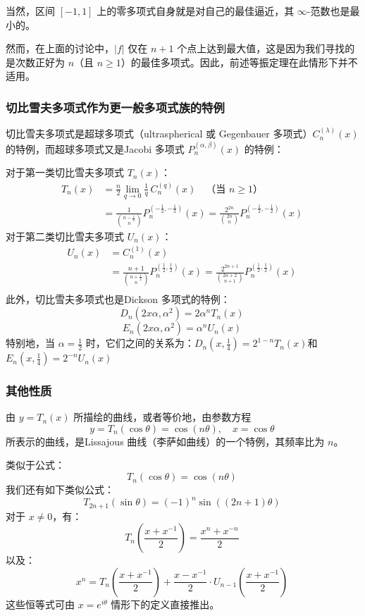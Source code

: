 当然，区间 $[-1,1]$ 上的零多项式自身就是对自己的最佳逼近，其 $\infty$-范数也是最小的。

然而，在上面的讨论中，$|f|$ 仅在 $n + 1$ 个点上达到最大值，这是因为我们寻找的是次数正好为 $n$（且 $n \geq 1$）的最佳多项式。因此，前述等振定理在此情形下并不适用。
\subsubsection{切比雪夫多项式作为更一般多项式族的特例}
切比雪夫多项式是超球多项式（ultraspherical 或 Gegenbauer 多项式）$C_n^{(\lambda)}(x)$ 的特例，而超球多项式又是Jacobi 多项式 $P_n^{(\alpha, \beta)}(x)$ 的特例：

对于第一类切比雪夫多项式 $T_n(x)$：
$$
\begin{aligned}
T_n(x) &= \frac{n}{2} \lim_{q \to 0} \frac{1}{q} \, C_n^{(q)}(x) \quad \text{（当 } n \geq 1\text{）}\\
&= \frac{1}{\binom{n - \frac{1}{2}}{n}} P_n^{(-\frac{1}{2}, -\frac{1}{2})}(x) = \frac{2^{2n}}{\binom{2n}{n}} P_n^{(-\frac{1}{2}, -\frac{1}{2})}(x)
\end{aligned}~
$$
对于第二类切比雪夫多项式 $U_n(x)$：
$$
\begin{aligned}
U_n(x) &= C_n^{(1)}(x)\\
 &= \frac{n+1}{\binom{n + \frac{1}{2}}{n}} P_n^{(\frac{1}{2}, \frac{1}{2})}(x) = \frac{2^{2n + 1}}{\binom{2n + 2}{n + 1}} P_n^{(\frac{1}{2}, \frac{1}{2})}(x)\\
\end{aligned}~
$$
此外，切比雪夫多项式也是Dickson 多项式的特例：
$$
D_n(2x\alpha, \alpha^2) = 2\alpha^n T_n(x)~
$$
$$
E_n(2x\alpha, \alpha^2) = \alpha^n U_n(x)~
$$
特别地，当 $\alpha = \frac{1}{2}$ 时，它们之间的关系为：$D_n(x, \tfrac{1}{4}) = 2^{1 - n} T_n(x)$和$E_n(x, \tfrac{1}{4}) = 2^{-n} U_n(x)$
\subsubsection{其他性质}
由 $y = T_n(x)$ 所描绘的曲线，或者等价地，由参数方程
$$
y = T_n(\cos \theta) = \cos(n\theta), \quad x = \cos \theta~
$$
所表示的曲线，是Lissajous 曲线（李萨如曲线）的一个特例，其频率比为 $n$。

类似于公式：
$$
T_n(\cos \theta) = \cos(n\theta)~
$$
我们还有如下类似公式：
$$
T_{2n+1}(\sin \theta) = (-1)^n \sin((2n + 1)\theta)~
$$
对于 $x \ne 0$，有：
$$
T_n\left( \frac{x + x^{-1}}{2} \right) = \frac{x^n + x^{-n}}{2}~
$$
以及：
$$
x^n = T_n\left( \frac{x + x^{-1}}{2} \right) + \frac{x - x^{-1}}{2} \cdot U_{n-1}\left( \frac{x + x^{-1}}{2} \right)~
$$
这些恒等式可由 $x = e^{i\theta}$ 情形下的定义直接推出。

